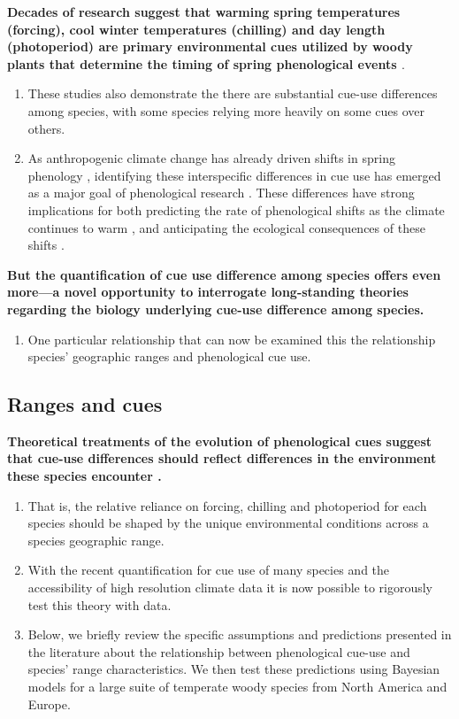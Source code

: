 \documentclass[11pt]{article}\usepackage[]{graphicx}\usepackage[]{color}
\begin{document}
\textbf{Decades of research suggest that warming spring temperatures (forcing), cool winter temperatures (chilling) and day length (photoperiod) are primary environmental cues utilized by woody plants that determine the timing of spring phenological events \cite{}}.
\begin{enumerate}
\item These studies also demonstrate the there are substantial cue-use differences among species, with some species relying more heavily on some cues over others.
\item  As anthropogenic climate change has already driven shifts in spring phenology \citep{}, identifying these interspecific differences in cue use has emerged as a major goal of phenological research \citep{}. These differences have strong implications for both predicting the rate of phenological shifts as the climate continues to warm \citep{}, and anticipating the ecological consequences of these shifts \citep{}.
\end{enumerate}
\textbf{ But the quantification of cue use difference among species offers even more---a novel opportunity to interrogate long-standing theories regarding the biology underlying cue-use difference among species.}
\begin{enumerate}
\item One particular relationship that can now be examined this the relationship species' geographic ranges and phenological cue use.
\end{enumerate}
\subsection*{Ranges and cues}
\textbf{Theoretical treatments of the evolution of phenological cues suggest that cue-use differences should reflect differences in the  environment these species encounter \citep{}.}
\begin{enumerate}
\item That is, the relative reliance on forcing, chilling and photoperiod for each species should be shaped by the unique environmental conditions across a species geographic range.
\item With the recent quantification for cue use of many species \citep{} and the accessibility of high resolution climate data it is now possible to rigorously test this theory with data.
\item Below, we briefly review the specific assumptions and predictions presented in the literature about the relationship between phenological cue-use and species' range characteristics. We then test these predictions using Bayesian models for a large suite of temperate woody species from North America and Europe.

\end{enumerate}
\end{document}
